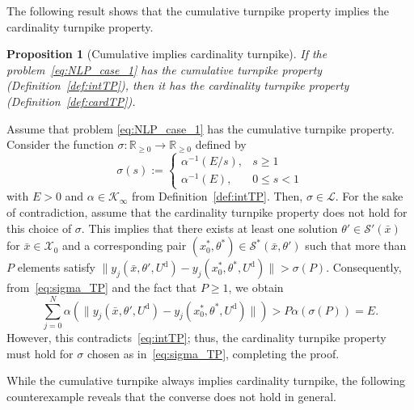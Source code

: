 \documentclass[a4paper,fleqn]{cas-dc}
\newtheorem{prop}{Proposition}
\begin{document}
The following result shows that the cumulative turnpike property implies the cardinality turnpike property.


\begin{prop}[Cumulative implies cardinality turnpike]\label{prop:intTP2cardTP}
	If the problem~\eqref{eq:NLP_case_1} has the cumulative turnpike property (Definition~\ref{def:intTP}), then it has the cardinality turnpike property (Definition~\ref{def:cardTP}).
\end{prop}
\begin{pf}
	Assume that problem \eqref{eq:NLP_case_1} has the cumulative turnpike property.
	Consider the function $\sigma:\mathbb{R}_{\geq0}\to\mathbb{R}_{\geq0}$ defined by
	\begin{equation}\label{eq:sigma_TP}
		\sigma(s):=
		\begin{cases}
			\alpha^{-1}\left({E}/{s}\right), & s\geq 1\\
			\alpha^{-1}({E}), & 0\leq s < 1
		\end{cases}
	\end{equation}
	with $E>0$ and $\alpha\in\mathcal{K}_\infty$ from Definition~\ref{def:intTP}. Then, $\sigma\in\mathcal{L}$.
	For the sake of contradiction, assume that the cardinality turnpike property does not hold for this choice of $\sigma$.
	This implies that there exists at least one solution $\theta'\in\mathcal{S}'(\bar{x})$ for $\bar{x}\in\mathcal{X}_0$ and a corresponding pair $(x^*_0,\theta^*)\in\mathcal{S}^*(\bar{x},\theta')$ such that more than $P$ elements satisfy $\|y_j(\bar{x},\theta',U^\mathrm{d})- y_j(x_0^*,\theta^*,U^\mathrm{d})\|>\sigma(P)$. Consequently, from~\eqref{eq:sigma_TP} and the fact that $P\geq 1$, we obtain
	\begin{equation*}
		\sum_{j=0}^{N}\alpha(\|y_j(\bar{x},\theta',U^\mathrm{d})-y_j(x_0^*,\theta^*,U^\mathrm{d})\|) > P\alpha(\sigma(P)) = E.
	\end{equation*}
	However, this contradicts~\eqref{eq:intTP}; thus, the cardinality turnpike property must hold for $\sigma$ chosen as in~\eqref{eq:sigma_TP}, completing the proof.
\end{pf}

While the cumulative turnpike always implies cardinality turnpike, the following counterexample reveals that the converse does not hold in general.
\end{document}
